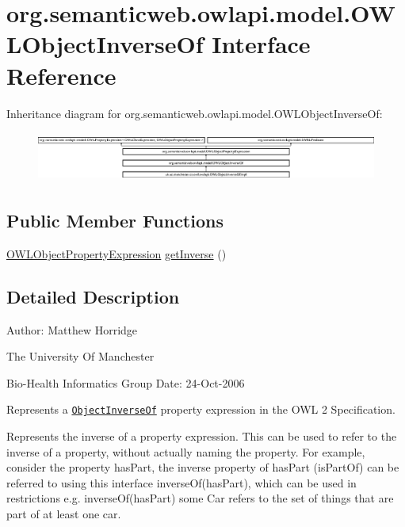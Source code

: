 \hypertarget{interfaceorg_1_1semanticweb_1_1owlapi_1_1model_1_1_o_w_l_object_inverse_of}{\section{org.\-semanticweb.\-owlapi.\-model.\-O\-W\-L\-Object\-Inverse\-Of Interface Reference}
\label{interfaceorg_1_1semanticweb_1_1owlapi_1_1model_1_1_o_w_l_object_inverse_of}
}
Inheritance diagram for org.\-semanticweb.\-owlapi.\-model.\-O\-W\-L\-Object\-Inverse\-Of\-:\begin{figure}[H]
\begin{center}
\leavevmode
\includegraphics[height=1.664190cm]{interfaceorg_1_1semanticweb_1_1owlapi_1_1model_1_1_o_w_l_object_inverse_of}
\end{center}
\end{figure}
\subsection*{Public Member Functions}
\begin{DoxyCompactItemize}
\item 
\hyperlink{interfaceorg_1_1semanticweb_1_1owlapi_1_1model_1_1_o_w_l_object_property_expression}{O\-W\-L\-Object\-Property\-Expression} \hyperlink{interfaceorg_1_1semanticweb_1_1owlapi_1_1model_1_1_o_w_l_object_inverse_of_a1e20063cf7e809f80cf57ca0439726a3}{get\-Inverse} ()
\end{DoxyCompactItemize}


\subsection{Detailed Description}
Author\-: Matthew Horridge\par
 The University Of Manchester\par
 Bio-\/\-Health Informatics Group Date\-: 24-\/\-Oct-\/2006 

Represents a \href{http://www.w3.org/TR/2009/REC-owl2-syntax-20091027/#Inverse_Object_Properties}{\tt Object\-Inverse\-Of} property expression in the O\-W\-L 2 Specification. 

Represents the inverse of a property expression. This can be used to refer to the inverse of a property, without actually naming the property. For example, consider the property has\-Part, the inverse property of has\-Part (is\-Part\-Of) can be referred to using this interface inverse\-Of(has\-Part), which can be used in restrictions e.\-g. inverse\-Of(has\-Part) some Car refers to the set of things that are part of at least one car. 

